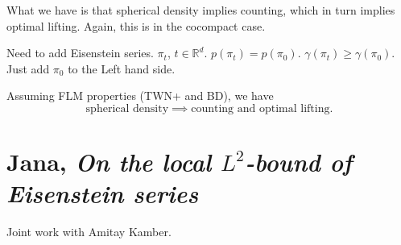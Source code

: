 \documentclass[reqno]{amsart} 
\begin{document}
What we have is that spherical density implies counting, which in turn implies optimal lifting.  Again, this is in the cocompact case.

Need to add Eisenstein series.  $\pi_t$, $t \in \mathbb{R}^d$.  $p (\pi_t ) = p (\pi_0 )$.  $\gamma (\pi_t ) \geq \gamma (\pi_0)$.
Just add $\pi_0$ to the Left hand side.
\begin{theorem}
  Assuming FLM properties (TWN+ and BD), we have
  \begin{equation*}
    \text{spherical density} \implies
    \text{counting and optimal lifting}.
  \end{equation*}
\end{theorem}
\section{Jana, \emph{On the local $L^2$-bound of Eisenstein series}}
Joint work with Amitay Kamber.
\end{document}
